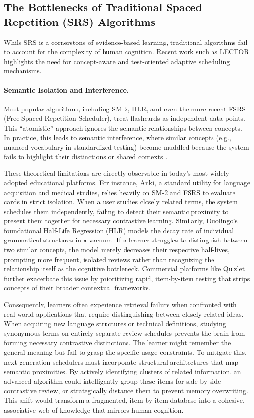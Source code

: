 \subsection{The Bottlenecks of Traditional Spaced Repetition (SRS) Algorithms}

While SRS is a cornerstone of evidence-based learning, traditional algorithms fail to account for the complexity of human cognition. Recent work such as LECTOR \cite{zhao2025lector} highlights the need for concept-aware and test-oriented adaptive scheduling mechanisms.

\paragraph{Semantic Isolation and Interference.}
Most popular algorithms, including SM-2, HLR, and even the more recent FSRS (Free Spaced Repetition Scheduler), treat flashcards as independent data points. This ``atomistic'' approach ignores the semantic relationships between concepts. In practice, this leads to semantic interference, where similar concepts (e.g., nuanced vocabulary in standardized testing) become muddled because the system fails to highlight their distinctions or shared contexts \cite{zhao2025lector}.

These theoretical limitations are directly observable in today's most widely adopted educational platforms. For instance, Anki, a standard utility for language acquisition and medical studies, relies heavily on SM-2 and FSRS to evaluate cards in strict isolation. When a user studies closely related terms, the system schedules them independently, failing to detect their semantic proximity to present them together for necessary contrastive learning. Similarly, Duolingo's foundational Half-Life Regression (HLR) models the decay rate of individual grammatical structures in a vacuum. If a learner struggles to distinguish between two similar concepts, the model merely decreases their respective half-lives, prompting more frequent, isolated reviews rather than recognizing the relationship itself as the cognitive bottleneck. Commercial platforms like Quizlet further exacerbate this issue by prioritizing rapid, item-by-item testing that strips concepts of their broader contextual frameworks\cite{duolingo2016hlr}.

Consequently, learners often experience retrieval failure when confronted with real-world applications that require distinguishing between closely related ideas. When acquiring new language structures or technical definitions, studying synonymous terms on entirely separate review schedules prevents the brain from forming necessary contrastive distinctions. The learner might remember the general meaning but fail to grasp the specific usage constraints. To mitigate this, next-generation schedulers must incorporate structural architectures that map semantic proximities. By actively identifying clusters of related information, an advanced algorithm could intelligently group these items for side-by-side contrastive review, or strategically distance them to prevent memory overwriting. This shift would transform a fragmented, item-by-item database into a cohesive, associative web of knowledge that mirrors human cognition.

